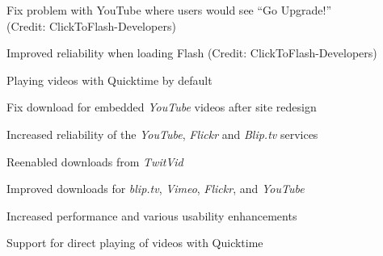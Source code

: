 \begin{changelog}
\item Fix problem with YouTube where users would see ``Go Upgrade!''\\(Credit: ClickToFlash-Developers)
\end{changelog}

\begin{changelog}
\item Improved reliability when loading Flash (Credit: ClickToFlash-Developers)
\item Playing videos with Quicktime by default
\item Fix download for embedded \emph{YouTube} videos after site redesign
\end{changelog}

\begin{changelog}
\item Increased reliability of the \emph{YouTube}, \emph{Flickr} and \emph{Blip.tv} services
\item Reenabled downloads from \emph{TwitVid}
\end{changelog}

\begin{changelog}
\item Improved downloads for \emph{blip.tv}, \emph{Vimeo}, \emph{Flickr}, and \emph{YouTube}
\end{changelog}

\begin{changelog}
\item Increased performance and various usability enhancements
\item Support for direct playing of videos with Quicktime
\end{changelog}

